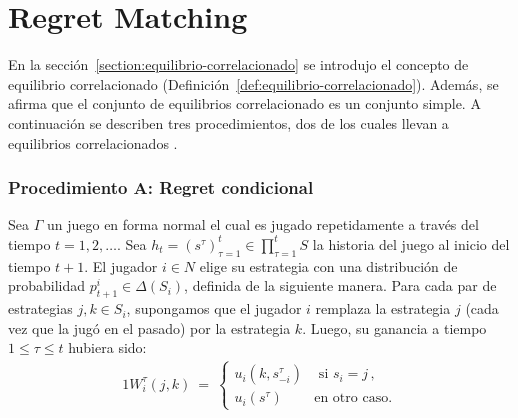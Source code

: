 \chapter{Regret Matching}
\label{chapter:regret-matching}

\newcommand{\graphicsRM}[2]{
\begin{figure}[h]
    \resizebox{\textwidth}{!}{
    \texttt{[image: graficas/regret-matching/\#1/procedimiento-A.png]}
    \texttt{[image: graficas/regret-matching/\#1/procedimiento-B.png]} 
    \texttt{[image: graficas/regret-matching/\#1/procedimiento-C.png]}
    }
    \caption{Gráficas del \textit{regret} con respecto al número de iteraciones del juego #2.}
    \label{fig:regret-rm-#1}
\end{figure}
}

En la sección~\ref{section:equilibrio-correlacionado} se introdujo el concepto de equilibrio correlacionado (Definición~\ref{def:equilibrio-correlacionado}). Además, se afirma que el conjunto de equilibrios correlacionado es un conjunto simple. A continuación se describen tres procedimientos, dos de los cuales llevan a equilibrios correlacionados \cite{bib:correlated-equilibrium}.

\subsection*{Procedimiento A: Regret condicional}

Sea $\Gamma$ un juego en forma normal el cual es jugado repetidamente a través del tiempo $t = 1, 2, \ldots $. 
Sea $h_t = (s^\tau)_{\tau = 1}^t \in \prod_{\tau = 1}^{t} S$ la historia del juego al inicio del tiempo $t+1$. El jugador $i \in N$ elige su estrategia con una distribución de probabilidad $p_{t+1}^i \in \Delta(S_i)$, definida de la siguiente manera. Para cada par de estrategias $j, k \in S_i$, supongamos que el jugador $i$ remplaza la estrategia $j$ (cada vez que la jugó en el pasado) por la estrategia $k$. Luego, su ganancia a tiempo $1\leq \tau \leq t$ hubiera sido:
\begin{alignat}{1}
W_i^{\tau}(j,k)\ =\ 
\begin{cases}
u_i(k, s_{-i}^{\tau}) &\text{ si } s_i = j \,, \\
u_i(s^\tau) & \text{en otro caso.} 
\end{cases}
\end{alignat}

